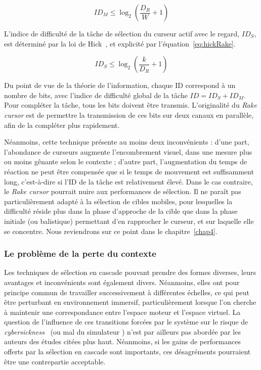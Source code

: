 	\begin{equation}
		\label{eq:fittsRake}
		ID_{M} \leq \log_2\left(\frac{D_{R}}{W} + 1 \right)
	\end{equation}
	
	L'indice de difficulté de la tâche de sélection du curseur actif avec le regard, $ID_{S}$, est déterminé par la loi de Hick~\cite{hick1952rate}, et explicité par l'équation~\ref{eq:hickRake}.
	
	\begin{equation}
		\label{eq:hickRake}
		ID_{S} \leq \log_2\left(\frac{k}{D_{R}} + 1 \right)
	\end{equation}
	
	Du point de vue de la théorie de l'information, chaque ID correspond à un nombre de bits, avec l'indice de difficulté global de la tâche $ID = ID_{S} + ID_{M}$. Pour compléter la tâche, tous les bits doivent être transmis. L'originalité du \emph{Rake cursor} est de permettre la transmission de ces bits sur deux canaux en parallèle, afin de la compléter plus rapidement.
	
	Néanmoins, cette technique présente au moins deux inconvénients : d'une part, l'abondance de curseurs augmente l'encombrement visuel, dans une mesure plus ou moins gênante selon le contexte ; d'autre part, l'augmentation du temps de réaction ne peut être compensée que si le temps de mouvement est suffisamment long, c'est-à-dire si l'ID de la tâche est relativement élevé. Dans le cas contraire, le \emph{Rake cursor} pourrait nuire aux performances de sélection. Il ne paraît pas particulièrement adapté à la sélection de cibles mobiles, pour lesquelles la difficulté réside plus dans la phase d'approche de la cible que dans la phase initiale (ou balistique) permettant d'en rapprocher le curseur, et sur laquelle elle se concentre. Nous reviendrons sur ce point dans le chapitre~\ref{chap4}.
		 
	\subsubsection{Le problème de la perte du contexte}
	Les techniques de sélection en cascade pouvant prendre des formes diverses, leurs avantages et inconvénients sont également divers. Néanmoins, elles ont pour principe commun de travailler successivement à différentes échelles, ce qui peut être perturbant en environnement immersif, particulièrement lorsque l'on cherche à maintenir une correspondance entre l'espace moteur et l'espace virtuel. La question de l'influence de ces transitions forcées par le système sur le risque de \emph{cybersickness}~\cite{laviola2000discussion} (ou \og mal du simulateur \fg{}) n'est par ailleurs pas abordée par les auteurs des études citées plus haut. Néanmoins, si les gains de performances offerts par la sélection en cascade sont importants, ces désagréments pourraient être une contrepartie acceptable.
	

